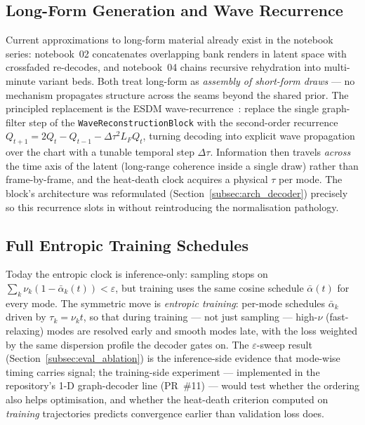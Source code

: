 \documentclass[12pt,a4paper]{article}
\begin{document}
\subsection{Long-Form Generation and Wave Recurrence}

Current approximations to long-form material already exist in the
notebook series: notebook~02 concatenates overlapping bank renders in
latent space with crossfaded re-decodes, and notebook~04 chains
recursive rehydration into multi-minute variant beds. Both treat
long-form as \emph{assembly of short-form draws} — no mechanism
propagates structure across the seams beyond the shared prior. The
principled replacement is the ESDM wave-recurrence~\cite{esdm}: replace
the single graph-filter step of the \texttt{WaveReconstructionBlock}
with the second-order recurrence $Q_{t+1} = 2Q_t - Q_{t-1} -
\Delta\tau^2 L_F Q_t$, turning decoding into explicit wave propagation
over the chart with a tunable temporal step $\Delta\tau$. Information
then travels \emph{across} the time axis of the latent (long-range
coherence inside a single draw) rather than frame-by-frame, and the
heat-death clock acquires a physical $\tau$ per mode. The block's
architecture was reformulated (Section~\ref{subsec:arch_decoder})
precisely so this recurrence slots in without reintroducing the
normalisation pathology.

\subsection{Full Entropic Training Schedules}

Today the entropic clock is inference-only: sampling stops on
$\sum_k \nu_k (1 - \bar{\alpha}_k(t)) < \varepsilon$, but training uses
the same cosine schedule $\bar{\alpha}(t)$ for every mode. The
symmetric move is \emph{entropic training}: per-mode schedules
$\bar{\alpha}_k$ driven by $\tau_k = \nu_k t$, so that during training
— not just sampling — high-$\nu$ (fast-relaxing) modes are resolved
early and smooth modes late, with the loss weighted by the same
dispersion profile the decoder gates on. The $\varepsilon$-sweep result
(Section~\ref{subsec:eval_ablation}) is the inference-side evidence
that mode-wise timing carries signal; the training-side experiment —
implemented in the repository's 1-D graph-decoder line (PR~\#11) —
would test whether the ordering also helps optimisation, and whether
the heat-death criterion computed on \emph{training} trajectories
predicts convergence earlier than validation loss does.
\end{document}
